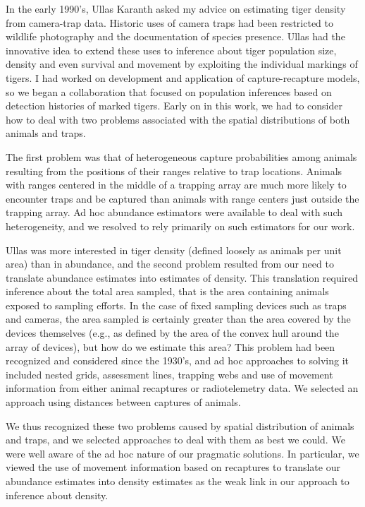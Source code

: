 In the early 1990's, Ullas Karanth asked my advice on estimating tiger
density from camera-trap data. Historic uses of camera traps had been
restricted to wildlife photography and the documentation of species
presence. Ullas had the innovative idea to extend these uses to
inference about tiger population size, density and even survival and
movement by exploiting the individual markings of tigers.  I had
worked on development and application of capture-recapture models, so
we began a collaboration that focused on population inferences based
on detection histories of marked tigers. Early on in this work, we had
to consider how to deal with two problems associated with the spatial
distributions of both animals and traps.

The first problem was that of heterogeneous capture probabilities
among animals resulting from the positions of their ranges relative to
trap locations. Animals with ranges centered in the middle of a
trapping array are much more likely to encounter traps and be captured
than animals with range centers just outside the trapping array. Ad
hoc abundance estimators were available to deal with such
heterogeneity, and we resolved to rely primarily on such estimators
for our work.  


Ullas was more interested in tiger density (defined
loosely as animals per unit area) than in abundance, and the second
problem resulted from our need to translate abundance estimates into
estimates of density.  This translation required inference about the
total area sampled, that is the area containing animals exposed to
sampling efforts. In the case of fixed sampling devices such as traps
and cameras, the area sampled is certainly greater than the area
covered by the devices themselves (e.g., as defined by the area of the
convex hull around the array of devices), but how do we estimate this
area?  This problem had been recognized and considered since the
1930's, and ad hoc approaches to solving it included nested grids,
assessment lines, trapping webs and use of movement information from
either animal recaptures or radiotelemetry data. We selected an
approach using distances between captures of animals.  

We thus
recognized these two problems caused by spatial distribution of
animals and traps, and we selected approaches to deal with them as
best we could. We were well aware of the ad hoc nature of our
pragmatic solutions. In particular, we viewed the use of movement
information based on recaptures to translate our abundance estimates
into density estimates as the weak link in our approach to inference
about density. 

